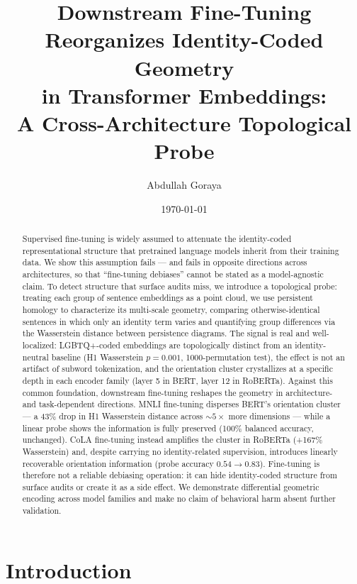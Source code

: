 \documentclass[11pt]{article}
\title{Downstream Fine-Tuning Reorganizes Identity-Coded Geometry \\
       in Transformer Embeddings: \\
       A Cross-Architecture Topological Probe}
\author{Abdullah Goraya}
\date{\today}
\begin{document}
\maketitle

\begin{abstract}
Supervised fine-tuning is widely assumed to attenuate the identity-coded representational structure that pretrained language models inherit from their training data. We show this assumption fails --- and fails in opposite directions across architectures, so that ``fine-tuning debiases'' cannot be stated as a model-agnostic claim. To detect structure that surface audits miss, we introduce a topological probe: treating each group of sentence embeddings as a point cloud, we use persistent homology to characterize its multi-scale geometry, comparing otherwise-identical sentences in which only an identity term varies and quantifying group differences via the Wasserstein distance between persistence diagrams. The signal is real and well-localized: LGBTQ+-coded embeddings are topologically distinct from an identity-neutral baseline (H1 Wasserstein $p = 0.001$, 1000-permutation test), the effect is not an artifact of subword tokenization, and the orientation cluster crystallizes at a specific depth in each encoder family (layer 5 in BERT, layer 12 in RoBERTa). Against this common foundation, downstream fine-tuning reshapes the geometry in architecture- and task-dependent directions. MNLI fine-tuning disperses BERT's orientation cluster --- a 43\% drop in H1 Wasserstein distance across $\sim 5\times$ more dimensions --- while a linear probe shows the information is fully preserved (100\% balanced accuracy, unchanged). CoLA fine-tuning instead amplifies the cluster in RoBERTa (+167\% Wasserstein) and, despite carrying no identity-related supervision, introduces linearly recoverable orientation information (probe accuracy $0.54 \rightarrow 0.83$). Fine-tuning is therefore not a reliable debiasing operation: it can hide identity-coded structure from surface audits or create it as a side effect. We demonstrate differential geometric encoding across model families and make no claim of behavioral harm absent further validation.
\end{abstract}

\section{Introduction}\label{sec:intro}
\end{document}
